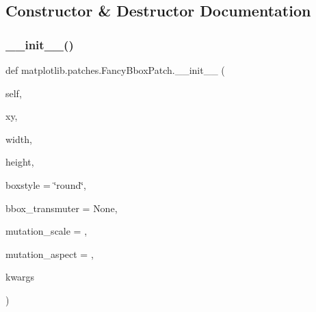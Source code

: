 \subsection{Constructor \& Destructor Documentation}
\mbox{\label{classmatplotlib_1_1patches_1_1FancyBboxPatch_a788b262647aee82e1b3da4275ee63a6a}} 
\subsubsection{\texorpdfstring{\+\_\+\+\_\+init\+\_\+\+\_\+()}{\_\_init\_\_()}}
{\footnotesize\ttfamily def matplotlib.\+patches.\+Fancy\+Bbox\+Patch.\+\_\+\+\_\+init\+\_\+\+\_\+ (\begin{DoxyParamCaption}\item[{}]{self,  }\item[{}]{xy,  }\item[{}]{width,  }\item[{}]{height,  }\item[{}]{boxstyle = {\ttfamily \char`\"{}round\char`\"{}},  }\item[{}]{bbox\+\_\+transmuter = {\ttfamily None},  }\item[{}]{mutation\+\_\+scale = {},  }\item[{}]{mutation\+\_\+aspect = {},  }\item[{}]{kwargs }\end{DoxyParamCaption})}

